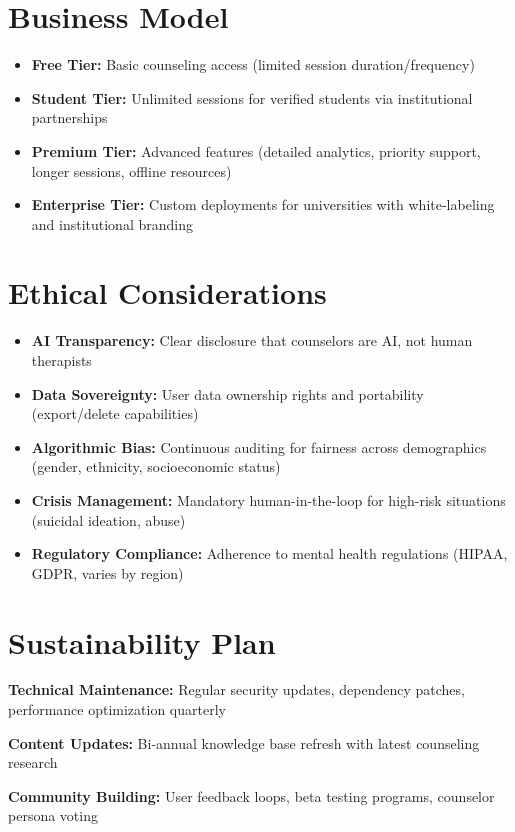\documentclass[11pt,a4paper]{report}
\begin{document}
\section{Business Model}
\begin{itemize}
    \item \textbf{Free Tier:} Basic counseling access (limited session duration/frequency)
    \item \textbf{Student Tier:} Unlimited sessions for verified students via institutional partnerships
    \item \textbf{Premium Tier:} Advanced features (detailed analytics, priority support, longer sessions, offline resources)
    \item \textbf{Enterprise Tier:} Custom deployments for universities with white-labeling and institutional branding
\end{itemize}

\section{Ethical Considerations}
\begin{itemize}
    \item \textbf{AI Transparency:} Clear disclosure that counselors are AI, not human therapists
    \item \textbf{Data Sovereignty:} User data ownership rights and portability (export/delete capabilities)
    \item \textbf{Algorithmic Bias:} Continuous auditing for fairness across demographics (gender, ethnicity, socioeconomic status)
    \item \textbf{Crisis Management:} Mandatory human-in-the-loop for high-risk situations (suicidal ideation, abuse)
    \item \textbf{Regulatory Compliance:} Adherence to mental health regulations (HIPAA, GDPR, varies by region)
\end{itemize}

\section{Sustainability Plan}
\textbf{Technical Maintenance:} Regular security updates, dependency patches, performance optimization quarterly

\textbf{Content Updates:} Bi-annual knowledge base refresh with latest counseling research

\textbf{Community Building:} User feedback loops, beta testing programs, counselor persona voting
\end{document}
